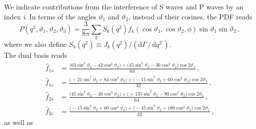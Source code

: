 \documentclass[aps,prd,reprint,nofootinbib,preprintnumbers]{revtex4}
\newcommand{\rmdx}[1]{\mbox{d} #1 \,} %
\renewcommand{\theta}{\vartheta}
\begin{document}
We indicate contributions from the interference of S waves and P waves by an index \emph{i}. In terms of the angles $\theta_1$ and $\theta_2$, instead of their cosines, the PDF reads
\begin{equation}
    P(q^2, \theta_1, \theta_2, \theta_3) = \frac{3}{8\pi} \sum_k S_k(q^2) f_k(\cos\theta_1, \cos\theta_2, \phi) \sin\theta_1 \sin\theta_2\,,
\end{equation}
where we also define $S_k(q^2) \equiv J_k(q^2) / (\rmdx{\Gamma} /\, \rmdx{q^2})$.\\

The dual basis reads
\begin{equation}
\begin{aligned}
    \hat{f}_{1s} & = \frac{\big( 63 \sin^2\theta_2 - 42 \cos^2\theta_2\big) + \big(  45 \sin^2\theta_2 - 30 \cos^2\theta_2\big)\cos 2\theta_1}{64} \,,\\
    \hat{f}_{1c} & = \frac{\big(-21 \sin^2\theta_2 + 84 \cos^2\theta_2\big) + \big( -15 \sin^2\theta_2 + 60 \cos^2\theta_2\big)\cos 2\theta_1}{32} \,,\\
    \hat{f}_{2s} & = \frac{\big( 45 \sin^2\theta_2 - 30 \cos^2\theta_2\big) + \big(+135 \sin^2\theta_2 - 90 \cos^2\theta_2\big)\cos 2\theta_1}{64} \,,\\
    \hat{f}_{2c} & = \frac{\big(-15 \sin^2\theta_2 + 60 \cos^2\theta_2\big) + \big( -45 \sin^2\theta_2 +180 \cos^2\theta_2\big)\cos 2\theta_1}{32} \,,
\end{aligned}
\end{equation}
as well as
\end{document}
